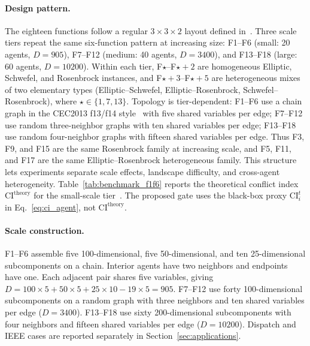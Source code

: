 \documentclass[conference]{IEEEtran}
\begin{document}
\paragraph{Design pattern.} The eighteen functions follow a regular $3\times3\times2$ layout defined in~\cite{ref_macpo}. Three scale tiers repeat the same six-function pattern at increasing size: F1--F6 (small: 20 agents, $D{=}905$), F7--F12 (medium: 40 agents, $D{=}3400$), and F13--F18 (large: 60 agents, $D{=}10200$). Within each tier, F$\star$--F$\star{+}2$ are homogeneous Elliptic, Schwefel, and Rosenbrock instances, and F$\star{+}3$--F$\star{+}5$ are heterogeneous mixes of two elementary types (Elliptic--Schwefel, Elliptic--Rosenbrock, Schwefel--Rosenbrock), where $\star\in\{1,7,13\}$. Topology is tier-dependent: F1--F6 use a chain graph in the CEC2013 f13/f14 style~\cite{ref_cec2013} with five shared variables per edge; F7--F12 use random three-neighbor graphs with ten shared variables per edge; F13--F18 use random four-neighbor graphs with fifteen shared variables per edge. Thus F3, F9, and F15 are the same Rosenbrock family at increasing scale, and F5, F11, and F17 are the same Elliptic--Rosenbrock heterogeneous family. This structure lets experiments separate scale effects, landscape difficulty, and cross-agent heterogeneity. Table~\ref{tab:benchmark_f1f6} reports the theoretical conflict index $\mathrm{CI}^{\mathrm{theory}}$ for the small-scale tier~\cite{ref_macpo}. The proposed gate uses the black-box proxy $\mathrm{CI}_i^t$ in Eq.~\eqref{eq:ci_agent}, not $\mathrm{CI}^{\mathrm{theory}}$.

\paragraph{Scale construction.} F1--F6 assemble five 100-dimensional, five 50-dimensional, and ten 25-dimensional subcomponents on a chain. Interior agents have two neighbors and endpoints have one. Each adjacent pair shares five variables, giving $D=100\times5+50\times5+25\times10-19\times5=905$. F7--F12 use forty 100-dimensional subcomponents on a random graph with three neighbors and ten shared variables per edge ($D=3400$). F13--F18 use sixty 200-dimensional subcomponents with four neighbors and fifteen shared variables per edge ($D=10200$). Dispatch and IEEE cases are reported separately in Section~\ref{sec:applications}.
\end{document}

